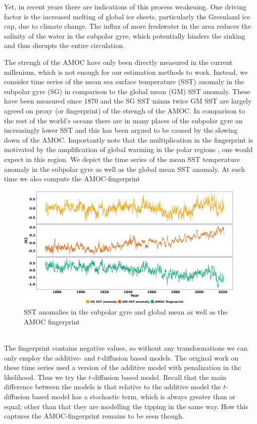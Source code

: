 Yet, in recent years there are indications of this process weakening. One driving factor is the increased melting of global ice sheets, particularly the Greenland ice cap, due to climate change. The influx of more freshwater in the area reduces the salinity of the water in the subpolar gyre, which potentially hinders the sinking and thus disrupts the entire circulation. 

The strengh of the AMOC have only been directly measured in the current millenium, which is not enough for our estimation methods to work. Instead, we consider time series of the mean sea surface temperature (SST) anomaly in the subpolar gyre (SG) in comparison to the global mean (GM) SST anomaly. These have been measured since $1870$ and the SG SST minus twice GM SST are largely agreed on proxy (or fingerprint) of the strengh of the AMOC. In comparison to the rest of the world's oceans there are in many places of the subpolar gyre an increasingly lower SST and this has been argued to be caused by the slowing down of the AMOC. Importantly note that the multiplication in the fingerprint is motivated by the amplification of global warming in the polar regions \cite[caption of figure 1]{Ditlevsen2023}, one would expect in this region.
\noindent We depict the time series of the mean SST temperature anomaly in the subpolar gyre as well as the global mean SST anomaly. At each time we also compute the AMOC-fingerprint
\begin{figure}[h!]
    \begin{center}
    \includegraphics[scale = .06]{figures/AMOC_data_plot.jpeg}
    \caption{SST anomalies in the subpolar gyre and global mean as well as the AMOC fingerprint}
    \label{figure:AMOC_plot}
    \end{center}
\end{figure}\\
The fingerprint contains negative values, so without any transformations we can only employ the additive- and $t$-diffusion based models. The original work on these time series \cite{Ditlevsen2023} used a version of the additive model with penalization in the likelihood. Thus we try the $t$-diffusion based model. Recall that the main difference between the models is that relative to the additive model the $t$-diffusion based model has a stochastic term, which is always greater than or equal; other than that they are modelling the tipping in the same way. How this captures the AMOC-fingerprint remains to be seen though.
